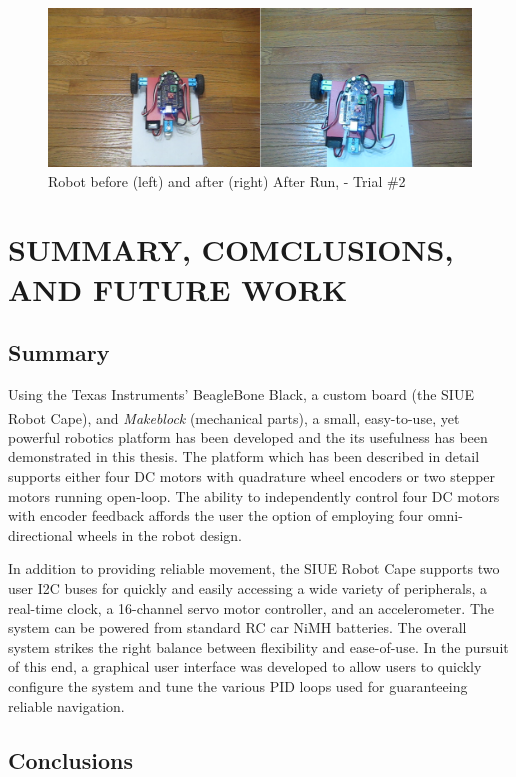 \documentclass[12pt,oneside,final]{siuethesis}
\theoremstyle{definition}
\begin{document}
\begin{figure}[!t]
 \centering
 \includegraphics[scale=.35,keepaspectratio=true]{./images/robot-test2.png}
 \caption{Robot before (left) and after (right) After Run, - Trial \#2}
 \label{fig:robottest2}
\end{figure}


\chapter{SUMMARY, COMCLUSIONS, AND FUTURE WORK}

\section{Summary}

Using the Texas Instruments' BeagleBone Black, a custom board (the SIUE Robot Cape), and \emph{Makeblock}\textsuperscript{\textregistered} (mechanical parts), a small, easy-to-use, yet powerful robotics platform has been developed and the its usefulness has been demonstrated in this thesis. The platform which has been described in detail supports either four DC motors with quadrature wheel encoders or two stepper motors running open-loop. The ability to independently control four DC motors with encoder feedback affords the user the option of employing four omni-directional wheels in the robot design.

In addition to providing reliable movement, the SIUE Robot Cape supports two user I2C buses for quickly and easily accessing a wide variety of peripherals, a real-time clock, a 16-channel servo motor controller, and an accelerometer. The system can be powered from standard RC car NiMH batteries.  The overall system strikes the right balance between flexibility and ease-of-use. In the pursuit of this end, a graphical user interface was developed to allow users to quickly configure the system and tune the various PID loops used for guaranteeing reliable navigation. 

\section{Conclusions}
\end{document}
